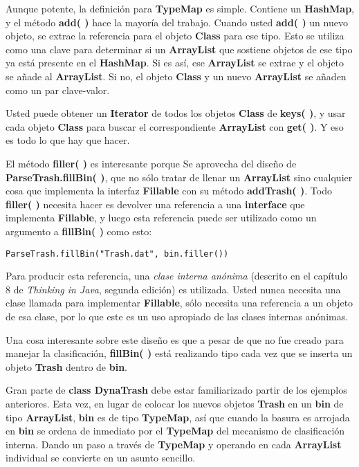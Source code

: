 Aunque potente, la definición para \textbf{TypeMap} es simple. Contiene un \textbf{HashMap}, y el método \textbf{add( )} hace la mayoría del trabajo. Cuando usted \textbf{add( )} un nuevo objeto, se extrae la referencia para el objeto \textbf{Class} para ese tipo. Esto se utiliza como una clave para determinar si un \textbf{ArrayList} que sostiene objetos de ese tipo ya está presente en el \textbf{HashMap}. Si es así, ese \textbf{ArrayList} se extrae y el objeto se añade al \textbf{ArrayList}. Si no, el objeto \textbf{Class} y un nuevo \textbf{ArrayList} se añaden como un par clave-valor.       \newline

Usted puede obtener un \textbf{Iterator} de todos los objetos \textbf{Class} de   \textbf{keys( )}, y usar cada objeto \textbf{Class} para buscar el correspondiente \textbf{ArrayList} con \textbf{get( )}. Y eso es todo lo que hay que hacer.         \newline

El método \textbf{filler( )} es interesante porque Se aprovecha del diseño de \textbf{ParseTrash.fillBin( )},  que no sólo tratar de llenar un \textbf{ArrayList} sino cualquier cosa que implementa la interfaz \textbf{Fillable} con su método \textbf{addTrash( )}.  Todo \textbf{filler( )} necesita hacer es devolver una referencia a una \textbf{interface} que implementa \textbf{Fillable}, y luego esta referencia puede ser utilizado como un argumento a \textbf{fillBin( )} como esto:    \newline

\begin{lstlisting} 
ParseTrash.fillBin("Trash.dat", bin.filler()) 
\end{lstlisting}

Para producir esta referencia, una \textit{clase interna anónima} (descrito en el capítulo 8 de \textit{Thinking in Java}, segunda edición) es utilizada. Usted nunca necesita una clase llamada para implementar \textbf{Fillable}, sólo necesita una referencia a un objeto de esa clase, por lo que este es un uso apropiado de las clases internas anónimas. \newline

Una cosa interesante sobre este diseño es que a pesar de que no fue creado para manejar la clasificación, \textbf{fillBin( )} está realizando tipo cada vez que se inserta un objeto \textbf{Trash} dentro de \textbf{bin}.        \newline

Gran parte de \textbf{class DynaTrash} debe estar familiarizado partir de los ejemplos anteriores. Esta vez, en lugar de colocar los nuevos objetos \textbf{Trash} en un \textbf{bin} de tipo \textbf{ArrayList}, \textbf{bin} es de tipo \textbf{TypeMap}, así que cuando la basura es arrojada en \textbf{bin} se ordena de inmediato por el \textbf{TypeMap} del mecanismo de clasificación interna. Dando un paso a través de \textbf{TypeMap} y operando en cada \textbf{ArrayList} individual se convierte en un asunto sencillo.  \newline

